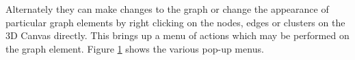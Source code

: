 \documentclass[runningheads]{cl2emult}
\begin{document}
Alternately they can make changes to
the graph or change the appearance of particular graph elements by
right
clicking on the nodes, edges or clusters on the 3D Canvas directly.
This brings up a menu of actions which may be performed on the graph
element.  Figure \ref{fig-popupmenus} shows the various pop-up menus.

\begin{figure}
  \label{fig-popupmenus}
  \subfigure[Edge] {
    \label{fig-edgemenu}
\scalebox{0.3}{
}}
\end{figure}
\end{document}
